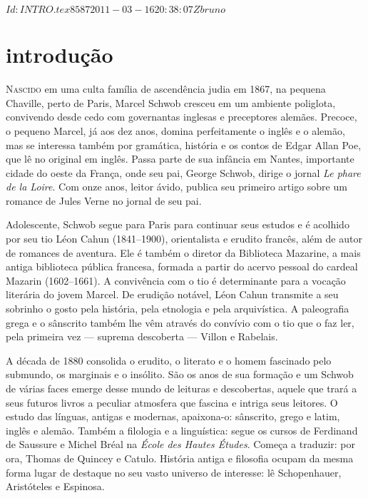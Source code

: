\SVN $Id: INTRO.tex 8587 2011-03-16 20:38:07Z bruno $

\chapter[Introdução, por Claudia Borges de Faveri]{introdução}

\textsc{Nascido} em uma culta família de ascendência judia em 1867, na pequena
Chaville, perto de Paris, Marcel Schwob cresceu em um ambiente poliglota,
convivendo desde cedo com governantas inglesas e preceptores alemães. Precoce,
o pequeno Marcel, já aos dez anos, domina perfeitamente o inglês e o alemão,
mas se interessa também por gramática, história e os contos de Edgar Allan Poe,
que lê no original em inglês. Passa parte de sua infância em Nantes,
importante cidade do oeste da França, onde seu pai, George Schwob, dirige o
jornal \textit{Le phare de la Loire}. Com onze anos, leitor ávido, publica seu
primeiro artigo sobre um romance de Jules Verne no jornal de seu pai.

Adolescente, Schwob segue para Paris para continuar seus estudos e é
acolhido por seu tio Léon Cahun (1841--1900), orientalista e erudito francês,
além de autor de romances de aventura. Ele é também o diretor da Biblioteca
Mazarine, a mais antiga biblioteca pública francesa, formada a partir do acervo
pessoal do cardeal Mazarin (1602--1661). A convivência com o tio é determinante
para a vocação literária do jovem Marcel. De erudição notável, Léon Cahun
transmite a seu sobrinho o gosto pela história, pela etnologia e pela
arquivística. A paleografia grega e o sânscrito também lhe vêm através do
convívio com o tio que o faz ler, pela primeira vez --- suprema descoberta --- Villon e Rabelais.

A década de 1880 consolida o erudito, o literato e o homem fascinado pelo
submundo, os marginais e o insólito. São os anos de sua formação e um Schwob de
várias faces emerge desse mundo de leituras e descobertas, aquele que trará a
seus futuros livros a peculiar atmosfera que fascina e intriga seus leitores. O
estudo das línguas, antigas e modernas, apaixona-o: sânscrito, grego e latim,
inglês e alemão. Também a filologia e a linguística: segue os cursos de
Ferdinand de Saussure e Michel Bréal na \textit{École des Hautes Études}.
Começa a traduzir: por ora, Thomas de Quincey e Catulo. História antiga e
filosofia ocupam da mesma forma lugar de destaque no seu vasto universo de
interesse: lê Schopenhauer, Aristóteles e Espinosa.

